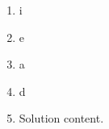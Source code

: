 \documentclass[12pt,twoside]{article}
\makeatletter
\def\emptycleardoublepage{\clearpage\if@twoside \ifodd\c@page\else
\thispagestyle{empty}%
\hbox{}\newpage\if@twocolumn\hbox{}\newpage\fi\fi\fi}
\makeatother
\begin{document}
\begin{multicols}{2}
\begin{enumerate}
 \end{enumerate}\end{multicols}\emptycleardoublepage{}\graphicspath{{C:/Users/iainc/anaconda3/Randomizer/Sample Course/Sample Assessment/}}\begin{multicols}{2} \begin{enumerate}\item i\item e\item a\item d\def \a{7}\def \atwoone{2}\def \atwotwo{5}\def \atwothree{3}\def \btwothree{7}\def \sumtwothree{10}\def \diftwothree{-4}\def \bigtwothree{300}\def \powtwothree{343}\def \logtwothree{0.5645750340535797}\def \factortwothree{133}\def \atwofour{1.16}\def \btwofour{1.362}\def \tooshorttwofour{10.1}\def \moneytwofour{10.10}\def \longertwofour{10.10000}\def \atwofive{0.12}\def \btwofive{0.12346}\def \athreeone{5}\def \bthreeone{4}\def \setthreetwo{[2, 5, 6]}\def \athreetwo{2}\def \bthreetwo{5}\def \cthreetwo{6}\def \controlthreethree{8}\def \athreethree{3}\def \topthreethree{0}\def \athreefour{3}\def \bthreefour{1}\def \listthreefour{[1, 2, 4, 5]}\def \afourone{8}\def \bfourone{-8}\def \fracfourone{-1}\def \rootfourtwo{12}\def \simplifiedfourtwo{2 \sqrt{3}}\def \sqrtlistfourtwo{[2, 3]}\def \outfourtwo{2}\def \infourtwo{3}\def \wowfourtwo{1}\def \afourthree{0}\def \nicethreefour{3x^{2}-x^{}}\def \nastythreefour{xyz^{3}}\def \cfourthree{4}\def \dfourthree{10}\def \infourthree{4x^{}}\def \outfourthree{+10y^{}}\def \afourfour{1303519}\def \nicefourfour{1,303,519}\def \goodfourfour{1,000,000.12345}\def \badfourfour{1,000,000.1}
\item Solution content.

\end{enumerate}
\end{multicols}
\end{document}
